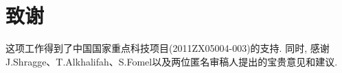 \section{致谢}
这项工作得到了中国国家重点科技项目(2011ZX05004-003)的支持. 同时, 感谢J.Shragge、T.Alkhalifah、S.Fomel以及两位匿名审稿人提出的宝贵意见和建议. 
